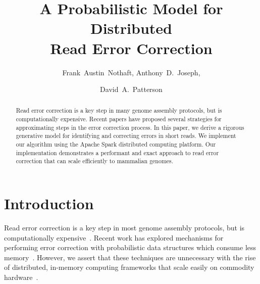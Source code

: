 \documentclass{llncs}
\begin{document}
%
\frontmatter          %
%
\pagestyle{headings}  %
\mainmatter              %
%
\title{A Probabilistic Model for Distributed \\ Read Error Correction}
%
%
\author{Frank~Austin~Nothaft, Anthony~D.~Joseph, \and David~A.~Patterson}
%
%

\maketitle              %

\begin{abstract}
Read error correction is a key step in many genome assembly protocols, but is computationally
expensive. Recent papers have proposed several strategies for approximating steps in the error
correction process. In this paper, we derive a rigorous generative model for identifying and correcting
errors in short reads. We implement our algorithm using the Apache Spark distributed computing
platform. Our implementation demonstrates a performant and exact approach to read error correction
that can scale efficiently to mammalian genomes.

\end{abstract}

\section{Introduction}
\label{sec:introduction}

Read error correction is a key step in most genome assembly protocols, but is computationally
expensive~\cite{kelley10}. Recent work has explored mechanisms for performing error correction with
probabilistic data structures which consume less memory~\cite{song14,shi10,liu13,heo14}. However,
we assert that these techniques are unnecessary with the rise of distributed, in-memory computing
frameworks that scale easily on commodity hardware~\cite{zaharia10}.
\end{document}
